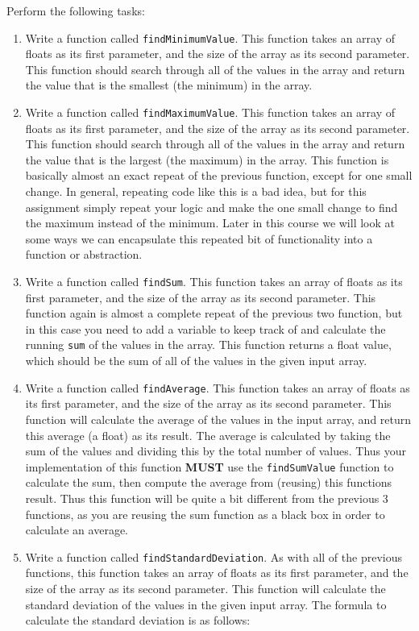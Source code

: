 \documentclass[11pt]{article}
\begin{document}
Perform the following tasks:

\begin{enumerate}
\item Write a function called \verb~findMinimumValue~.  This function takes
an array of floats as its first parameter, and the size of the
array as its second parameter.  This function should search through
all of the values in the array and return the value that is the
smallest (the minimum) in the array.

\item Write a function called \verb~findMaximumValue~.  This function takes an
array of floats as its first parameter, and the size of the array
as its second parameter.  This function should search through all
of the values in the array and return the value that is the largest
(the maximum) in the array.  This function is basically almost an
exact repeat of the previous function, except for one small change.
In general, repeating code like this is a bad idea, but for this
assignment simply repeat your logic and make the one small change
to find the maximum instead of the minimum.  Later in this course
we will look at some ways we can encapsulate this repeated bit of
functionality into a function or abstraction.

\item Write a function called \verb~findSum~.  This function takes an
array of floats as its first parameter, and the size of the array
as its second parameter.  This function again is almost a complete
repeat of the previous two function, but in this case you need to
add a variable to keep track of and calculate the running \verb~sum~ of
the values in the array.  This function returns a float value,
which should be the sum of all of the values in the given input
array.

\item Write a function called \verb~findAverage~.  This function takes
an array of floats as its first parameter, and the size of the array
as its second parameter.  This function will calculate the average
of the values in the input array, and return this average (a float)
as its result.  The average is calculated by taking the sum of the
values and dividing this by the total number of values.  Thus
your implementation of this function \textbf{MUST} use the \verb~findSumValue~
function to calculate the sum, then compute the average from
(reusing) this functions result.  Thus this function will be quite a
bit different from the previous 3 functions, as you are reusing the
sum function as a black box in order to calculate an average.

\item Write a function called \verb~findStandardDeviation~.  As with all of the
previous functions, this function takes an array of floats as its
first parameter, and the size of the array as its second parameter.
This function will calculate the standard deviation of the values
in the given input array.  The formula to calculate the standard deviation
is as follows:
\end{enumerate}
\end{document}
